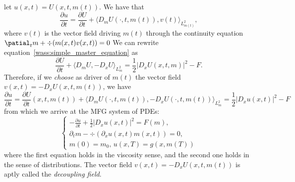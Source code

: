   let $u(x,t) = U(x,t,m(t))$. We have that
\begin{equation}
    \frac{\partial u}{\partial t} = \frac{\partial U}{\partial t} + \langle D_m U (\cdot, t, m(t)), v(t) \rangle_{L^2_{m(t)}},
\end{equation}
    where $v(t)$ is the vector field driving $m(t)$ through the continuity equation $\patial_t m + \div( m(x,t) v(x,t) ) = 0$
    We can rewrite equation~\eqref{wass:simple_master_equation} as 
\begin{equation}
    \frac{\partial U}{ \partial t} + \langle D_m U, - D_x U \rangle_{L^2_m} = \frac{1}{2} |D_x U(x,t,m)|^2 - F.
\end{equation}
    Therefore, if we \textit{choose} as driver of $m(t)$ the vector field $v(x,t) = - D_x U(x,t,m(t))$,
    we have
\begin{equation}
    \frac{\partial u}{\partial t} =  \frac{\partial U}{ \partial t}(x,t,m(t)) + \langle D_m U(\cdot, t, m(t) ), - D_x U(\cdot, t, m(t) ) \rangle_{L^2_m} = \frac{1}{2} |D_x u(x,t)|^2 - F
\end{equation}
    from which we arrive at the MFG system of PDEs:
\begin{equation}
    \begin{cases}
        - \frac{\partial u}{\partial t} + \frac{1}{2} |D_x u(x,t)|^2  = F(m), \\
        \partial_t m - \div( \partial_x u(x,t) m(x,t) ) = 0,\\
        m(0) = m_0, \, u(x,T) = g(x, m(T))
    \end{cases}
\end{equation}
    where the first equation holds in the viscosity sense, and the second
    one holds in the sense of distributions.
    The vector field $v(x,t) = -D_x U(x,t,m(t))$ is aptly called the \textit{decoupling field}.
